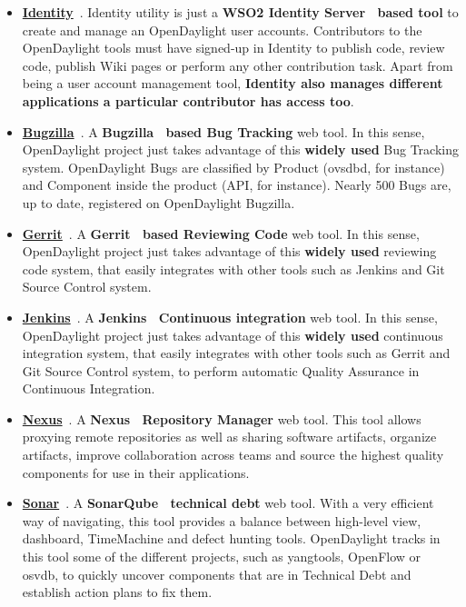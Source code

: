 \documentclass[a4paper, 12pt]{book}
\begin{document}
\begin{itemize}
\item{\textbf{\underline{Identity}}}~\cite{OpenDaylightIdentity}. Identity utility is just a \textbf{WSO2 Identity Server~\cite{WSO2IdentityServer} based tool} to create and manage an OpenDaylight user accounts. Contributors to the OpenDaylight tools must have signed-up in Identity to publish code, review code, publish Wiki pages or perform any other contribution task. Apart from being a user account management tool, \textbf{Identity also manages different applications a particular contributor has access too}.
\item{\textbf{\underline{Bugzilla}}}~\cite{OpenDaylightBugzilla}. A \textbf{Bugzilla~\cite{Bugzilla} based Bug Tracking} web tool. In this sense, OpenDaylight project just takes advantage of this \textbf{widely used} Bug Tracking system. OpenDaylight Bugs are classified by Product (ovsdbd, for instance) and Component inside the product (API, for instance). Nearly 500 Bugs are, up to date, registered on OpenDaylight Bugzilla.
\item{\textbf{\underline{Gerrit}}}~\cite{OpenDaylightGerrit}. A \textbf{Gerrit~\cite{Gerrit} based Reviewing Code} web tool. In this sense, OpenDaylight project just takes advantage of this \textbf{widely used} reviewing code system, that easily integrates with other tools such as Jenkins and Git Source Control system.
\item{\textbf{\underline{Jenkins}}}~\cite{OpenDaylightJenkins}. A \textbf{Jenkins~\cite{Jenkins} Continuous integration} web tool. In this sense, OpenDaylight project just takes advantage of this \textbf{widely used} continuous integration system, that easily integrates with other tools such as Gerrit and Git Source Control system, to perform automatic Quality Assurance in Continuous Integration.
\item{\textbf{\underline{Nexus}}}~\cite{OpenDaylightNexus}. A \textbf{Nexus~\cite{SonatypeNexus} Repository Manager} web tool. This tool allows proxying remote repositories as well as sharing software artifacts, organize artifacts, improve collaboration across teams and source the highest quality components for use in their applications.
\item{\textbf{\underline{Sonar}}}~\cite{OpenDaylightSonar}. A \textbf{SonarQube~\cite{SonarQube} technical debt} web tool. With a very efficient way of navigating, this tool provides a balance between high-level view, dashboard, TimeMachine and defect hunting tools. OpenDaylight tracks in this tool some of the different projects, such as yangtools, OpenFlow or osvdb, to quickly uncover components that are in Technical Debt and establish action plans to fix them.
\end{itemize}
\end{document}
